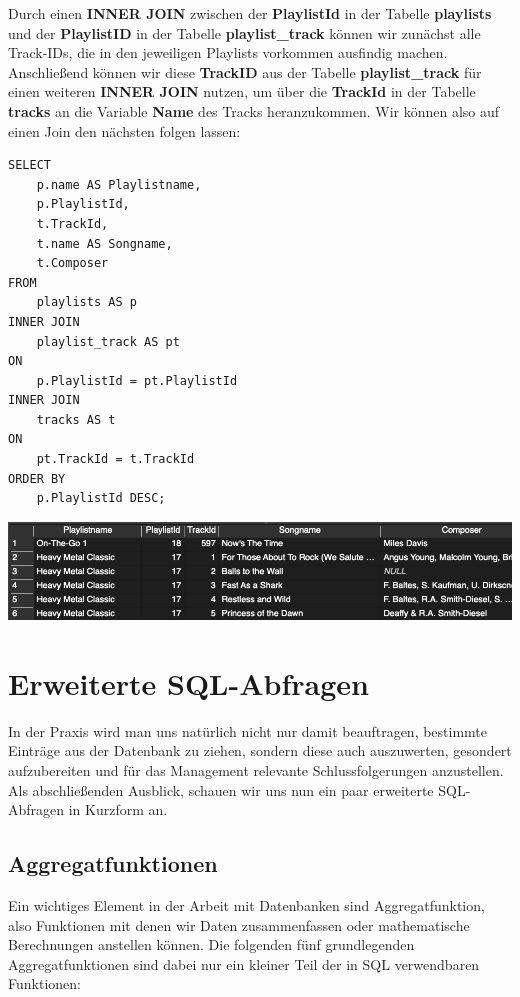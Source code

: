 \documentclass[
]{book}
\begin{document}
Durch einen \textbf{INNER JOIN} zwischen der \textbf{PlaylistId} in der Tabelle \textbf{playlists} und der \textbf{PlaylistID} in der Tabelle \textbf{playlist\_track} können wir zunächst alle Track-IDs, die in den jeweiligen Playlists vorkommen ausfindig machen. Anschließend können wir diese \textbf{TrackID} aus der Tabelle \textbf{playlist\_track} für einen weiteren \textbf{INNER JOIN} nutzen, um über die \textbf{TrackId} in der Tabelle \textbf{tracks} an die Variable \textbf{Name} des Tracks heranzukommen. Wir können also auf einen Join den nächsten folgen lassen:

\begin{verbatim}
SELECT
    p.name AS Playlistname,
    p.PlaylistId,
    t.TrackId,
    t.name AS Songname,
    t.Composer
FROM
    playlists AS p
INNER JOIN
    playlist_track AS pt
ON
    p.PlaylistId = pt.PlaylistId
INNER JOIN
    tracks AS t
ON 
    pt.TrackId = t.TrackId
ORDER BY
    p.PlaylistId DESC;
\end{verbatim}

\includegraphics[width=10.41667in,height=\textheight]{img-JOIN4.png}

\hypertarget{erweiterte-sql-abfragen}{%
\chapter{Erweiterte SQL-Abfragen}\label{erweiterte-sql-abfragen}}

In der Praxis wird man uns natürlich nicht nur damit beauftragen, bestimmte Einträge aus der Datenbank zu ziehen, sondern diese auch auszuwerten, gesondert aufzubereiten und für das Management relevante Schlussfolgerungen anzustellen. Als abschließenden Ausblick, schauen wir uns nun ein paar erweiterte SQL-Abfragen in Kurzform an.

\hypertarget{aggregatfunktionen}{%
\section{Aggregatfunktionen}\label{aggregatfunktionen}}

Ein wichtiges Element in der Arbeit mit Datenbanken sind Aggregatfunktion, also Funktionen mit denen wir Daten zusammenfassen oder mathematische Berechnungen anstellen können. Die folgenden fünf grundlegenden Aggregatfunktionen sind dabei nur ein kleiner Teil der in SQL verwendbaren Funktionen:
\end{document}

